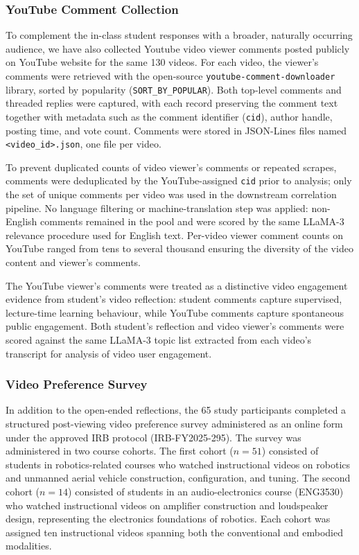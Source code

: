 \documentclass[fleqn,10pt]{JLA_article} %
\begin{document}
\subsubsection{YouTube Comment Collection}

To complement the in-class student responses with a broader, naturally occurring audience, we have also collected Youtube video viewer comments posted publicly on YouTube website for the same 130 videos. For each video, the viewer's comments were retrieved with the open-source \texttt{youtube-comment-downloader} library, sorted by popularity (\texttt{SORT\_BY\_POPULAR}). Both top-level comments and threaded replies were captured, with each record preserving the comment text together with metadata such as the comment identifier (\texttt{cid}), author handle, posting time, and vote count. Comments were stored in JSON-Lines files named \texttt{<video\_id>.json}, one file per video.

To prevent duplicated counts of video viewer's comments or repeated scrapes, comments were deduplicated by the YouTube-assigned \texttt{cid} prior to analysis; only the set of unique comments per video was used in the downstream correlation pipeline. No language filtering or machine-translation step was applied: non-English comments remained in the pool and were scored by the same LLaMA-3 relevance procedure used for English text. Per-video viewer comment counts on YouTube ranged from tens to several thousand ensuring the diversity of the video content and viewer's comments.

The YouTube viewer's comments were treated as a distinctive video engagement evidence from student's video reflection: student comments capture supervised, lecture-time learning behaviour, while YouTube comments capture spontaneous public engagement. Both student's reflection and video viewer's comments were scored against the same LLaMA-3 topic list extracted from each video's transcript for analysis of video user engagement.

\subsubsection{Video Preference Survey}
\label{sec:survey_method}

In addition to the open-ended reflections, the 65 study participants completed a structured post-viewing video preference survey administered as an online form under the approved IRB protocol (IRB-FY2025-295). The survey was administered in two course cohorts. The first cohort ($n = 51$) consisted of students in robotics-related courses who watched instructional videos on robotics and unmanned aerial vehicle construction, configuration, and tuning. The second cohort ($n = 14$) consisted of students in an audio-electronics course (ENG3530) who watched instructional videos on amplifier construction and loudspeaker design, representing the electronics foundations of robotics. Each cohort was assigned ten instructional videos spanning both the conventional and embodied modalities.
\end{document}
